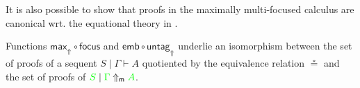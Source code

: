 \documentclass[runningheads]{llncs}
\newcommand{\tl}{\otimes \mathsf{L}}
\newcommand{\lright}{{\multimap}\mathsf{R}}
\newcommand{\unitl}{\mathsf{IL}}
\newcommand{\otL}{\tl}
\newcommand{\lolliR}{\lright}
\newcommand{\IL}{\unitl}
\newcommand{\green}[1]{{\color{green}#1}}
\newcommand{\up}{\Uparrow}
\newcommand{\dn}{\Downarrow}
\newcommand{\upm}{\Uparrow_{\mathsf{m}}}
\newcommand{\focus}{\mathsf{focus}}
\newcommand{\emb}{\mathsf{emb}}
\begin{document}
It is also possible to show that proofs in the maximally multi-focused calculus are canonical wrt. the equational theory in .
\begin{theorem}\label{thm3}
  Functions $\mathsf{max}_\up\circ \focus$ and $\emb \circ \mathsf{untag}_\up$ underlie an isomorphism between the set of proofs of a sequent $S \mid \Gamma \vdash A$ quotiented by the equivalence relation $\circeq$ and the set of proofs of $\green{S} \mid \green{\Gamma} \upm \green{A}$. %
\end{theorem}



\end{document}

